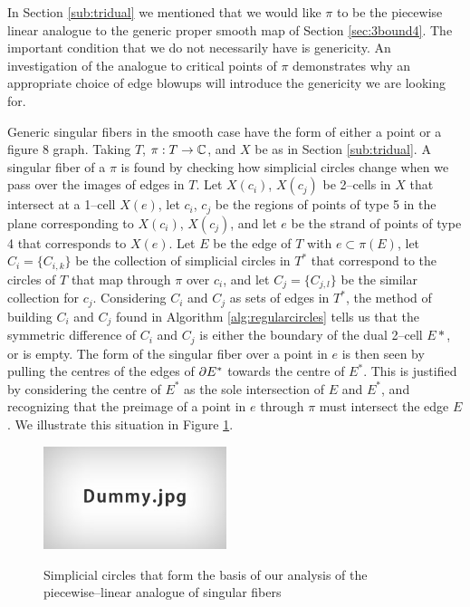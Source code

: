 In Section \ref{sub:tridual} we mentioned that we would like $\pi$ to be the piecewise linear analogue to the generic proper smooth map of Section \ref{sec:3bound4}.
The important condition that we do not necessarily have is genericity.
An investigation of the analogue to critical points of $\pi$ demonstrates why an appropriate choice of edge blowups will introduce the genericity we are looking for.

Generic singular fibers in the smooth case have the form of either a point or a figure 8 graph.
Taking $T$, $\pi:T\to\mathbb{C}$, and $X$ be as in Section \ref{sub:tridual}.
A singular fiber of a $\pi$ is found by checking how simplicial circles change when we pass over the images of edges in $T$.
Let $X(c_i)$, $X(c_j)$ be 2--cells in $X$ that intersect at a 1--cell $X(e)$, let $c_i$, $c_j$ be the regions of points of type 5 in the plane corresponding to $X(c_i)$, $X(c_j)$, and let $e$ be the strand of points of type 4 that corresponds to $X(e)$.
Let $E$ be the edge of $T$ with $e\subset\pi(E)$, let $C_i=\{C_{i,k}\}$ be the collection of simplicial circles in $T^*$ that correspond to the circles of $T$ that map through $\pi$ over $c_i$, and let $C_j=\{C_{j,l}\}$ be the similar collection for $c_j$.
Considering $C_i$ and $C_j$ as sets of edges in $T^*$, the method of building $C_i$ and $C_j$ found in Algorithm \ref{alg:regularcircles} tells us that the symmetric difference of $C_i$ and $C_j$ is either the boundary of the dual 2--cell $E*$, or is empty.
The form of the singular fiber over a point in $e$ is then seen by pulling the centres of the edges of $\partial E^*$ towards the centre of $E^*$.
This is justified by considering the centre of $E^*$ as the sole intersection of $E$ and $E^*$, and recognizing that the preimage of a point in $e$ through $\pi$ must intersect the edge $E$.
We illustrate this situation in Figure \ref{fig:plsingularities}.

\begin{figure}
	\centering
	\captionsetup{justification=centering}
	\caption{Simplicial circles that form the basis of our analysis of the piecewise--linear analogue of singular fibers}
	\includegraphics[height=3cm]{figures/dummy.jpg}
	\label{fig:plsingularities}
\end{figure}

